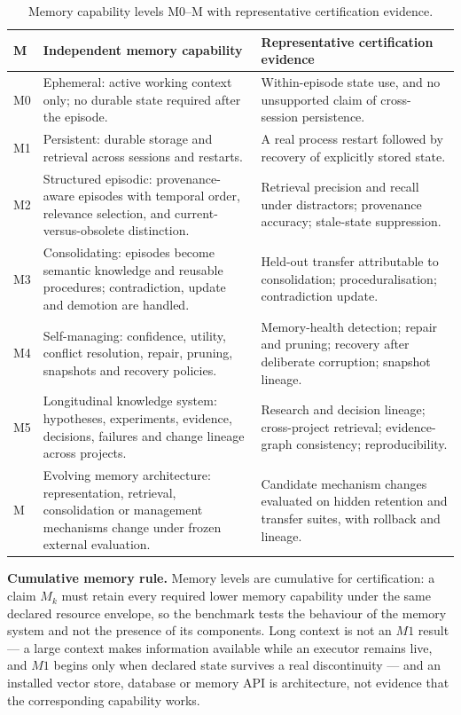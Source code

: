 \begin{table}[!htbp]
\centering\small
\begin{tabularx}{\textwidth}{@{}lYZ@{}}
\toprule
M & Independent memory capability & Representative certification evidence \\
\midrule
M0 & Ephemeral: active working context only; no durable state required after the episode. & Within-episode state use, and no unsupported claim of cross-session persistence. \\
M1 & Persistent: durable storage and retrieval across sessions and restarts. & A real process restart followed by recovery of explicitly stored state. \\
M2 & Structured episodic: provenance-aware episodes with temporal order, relevance selection, and current-versus-obsolete distinction. & Retrieval precision and recall under distractors; provenance accuracy; stale-state suppression. \\
M3 & Consolidating: episodes become semantic knowledge and reusable procedures; contradiction, update and demotion are handled. & Held-out transfer attributable to consolidation; proceduralisation; contradiction update. \\
M4 & Self-managing: confidence, utility, conflict resolution, repair, pruning, snapshots and recovery policies. & Memory-health detection; repair and pruning; recovery after deliberate corruption; snapshot lineage. \\
M5 & Longitudinal knowledge system: hypotheses, experiments, evidence, decisions, failures and change lineage across projects. & Research and decision lineage; cross-project retrieval; evidence-graph consistency; reproducibility. \\
M\Om{} & Evolving memory architecture: representation, retrieval, consolidation or management mechanisms change under frozen external evaluation. & Candidate mechanism changes evaluated on hidden retention and transfer suites, with rollback and lineage. \\
\bottomrule
\end{tabularx}
\caption{Memory capability levels M0--M\Om{} with representative certification evidence.}
\label{tab:m}
\end{table}

\textbf{Cumulative memory rule.} Memory levels are cumulative for certification: a claim $M_k$ must retain every required lower memory capability under the same declared resource envelope, so the benchmark tests the behaviour of the memory system and not the presence of its components. Long context is not an $M1$ result --- a large context makes information available while an executor remains live, and $M1$ begins only when declared state survives a real discontinuity --- and an installed vector store, database or memory API is architecture, not evidence that the corresponding capability works.

